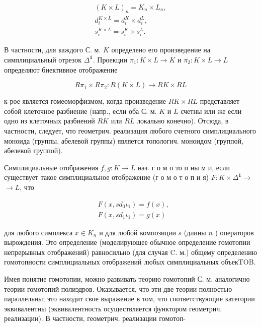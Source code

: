 \documentclass[10pt]{article}
\begin{document}
\[

\begin{gathered}

(K \times L)_{n}=K_{n} \times L_{n}, \\

d_{i}^{K \times L}=d_{i}^{K} \times d_{i}^{L}, \\

s_{i}^{K \times L}=s_{i}^{K} \times s_{i}^{L} .

\end{gathered}

\]



В частности, для каждого С. м. $K$ определено его произведение на симплициальный отрезок $\Delta^{\mathbf{1}}$. Проекции $\pi_{1}: K \times L \rightarrow K$ и $\pi_{2}: K \times L \rightarrow L$ определяют биективное отображение



\[

R \pi_{1} \times R \pi_{2}: R(K \times L) \longrightarrow R K \times R L

\]



к-рое является гомеоморфизмом, когда произведение $R K \times R L$ представляет собой клеточное разбиение (напр., если оба С. м. $K$ и $L$ счетны или же если одно из клеточных разбиений $R K$ или $R L$ локально конечно). Отсюда, в частности, следует, что геометрич. реализация любого счетного симплициального моноида (группы, абелевой группы) является топологич. моноидом (группой, абелевой группой).



Симплициальные отображения $f, g: K \rightarrow L$ наз. г о м о то п ны м и, если существует такое симплициальное отображение (г о м о т о п и я) $F: K \times \Delta^{\mathbf{1}} \rightarrow$ $\rightarrow L$, что



\[

\begin{aligned}

& F\left(x, s d_{0} \iota_{1}\right)=f(x), \\

& F\left(x, s d_{1} \iota_{1}\right)=g(x)

\end{aligned}

\]



для любого симплекса $x \in K_{n}$ и для любой композиции $s$ (длины $n$ ) операторов вырождения. Это определение (моделирующее обычное определение гомотопии непрерывных отображений) равносильно (для случая C. м.) общему определению гомотопности симплициальных отображений любых симплициальных объекTOB.



Имея понятие гомотопии, можно развивать теорию гомотопий С. м. аналогично теории гомотопий полиэдров. Оказывается, что эти две теории полностью параллельны; это находит свое выражение в том, что соответствующие категории эквивалентны (эквивалентность осуществляется функтором геометрич. реализации). В частности, геометрич. реализации гомотоп-
\end{document}
